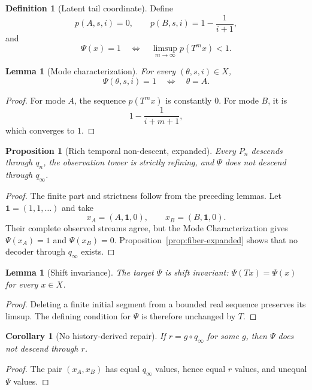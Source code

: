 \documentclass[11pt]{article}
\theoremstyle{plain}
\newtheorem{proposition}[theorem]{Proposition}
\newtheorem{lemma}[theorem]{Lemma}
\newtheorem{corollary}[theorem]{Corollary}
\theoremstyle{definition}
\newtheorem{definition}[theorem]{Definition}
\theoremstyle{remark}
\begin{document}
\begin{definition}[Latent tail coordinate]
Define
\[
p(A,s,i)=0,\qquad p(B,s,i)=1-\frac{1}{i+1},
\]
and
\[
\Psi(x)=1\quad\Longleftrightarrow\quad
\limsup_{m\to\infty}p(T^m x)<1.
\]
\end{definition}

\begin{lemma}[Mode characterization]
For every $(\theta,s,i)\in X$,
\[
\Psi(\theta,s,i)=1\quad\Longleftrightarrow\quad\theta=A.
\]
\end{lemma}

\begin{proof}
For mode $A$, the sequence $p(T^m x)$ is constantly $0$.  For mode $B$, it is
\[
1-\frac{1}{i+m+1},
\]
which converges to $1$.
\end{proof}

\begin{proposition}[Rich temporal non-descent, expanded]
\label{prop:rich-expanded}
Every $P_n$ descends through $q_n$, the observation tower is strictly refining,
and $\Psi$ does not descend through $q_\infty$.
\end{proposition}

\begin{proof}
The finite part and strictness follow from the preceding lemmas.  Let
$\mathbf 1=(1,1,\ldots)$ and take
\[
x_A=(A,\mathbf 1,0),\qquad x_B=(B,\mathbf 1,0).
\]
Their complete observed streams agree, but the Mode Characterization gives
$\Psi(x_A)=1$ and $\Psi(x_B)=0$.  Proposition~\ref{prop:fiber-expanded} shows
that no decoder through $q_\infty$ exists.
\end{proof}

\begin{lemma}[Shift invariance]
The target $\Psi$ is shift invariant: $\Psi(Tx)=\Psi(x)$ for every $x\in X$.
\end{lemma}

\begin{proof}
Deleting a finite initial segment from a bounded real sequence preserves its
limsup.  The defining condition for $\Psi$ is therefore unchanged by $T$.
\end{proof}

\begin{corollary}[No history-derived repair]
If $r=g\circ q_\infty$ for some $g$, then $\Psi$ does not descend through $r$.
\end{corollary}

\begin{proof}
The pair $(x_A,x_B)$ has equal $q_\infty$ values, hence equal $r$ values, and
unequal $\Psi$ values.
\end{proof}
\end{document}
